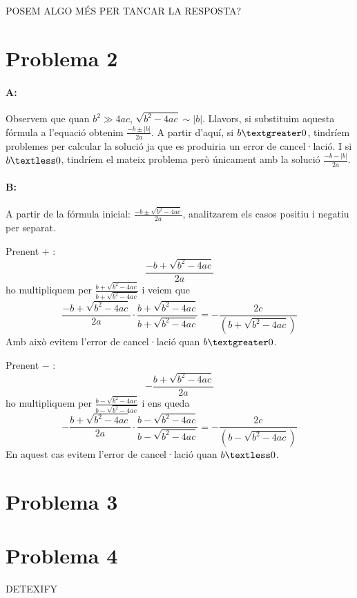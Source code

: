 \documentclass{article}
\begin{document}
	POSEM ALGO MÉS PER TANCAR LA RESPOSTA?
	
	\newpage
	
	\section{Problema 2}
	\paragraph{A:} Observem que quan $b^2 \gg 4ac$, $\sqrt{b^2-4ac}\sim|b|$. Llavors, si substituim aquesta fórmula a l'equació obtenim $\frac{-b\pm|b|}{2a}$. A partir d'aquí, si $b\textgreater0$, tindríem problemes per calcular la solució ja que es produiria un error de cancel·lació. I si $b\textless0$, tindríem el mateix problema però únicament amb la solució $\frac{-b-|b|}{2a}$.
	
	\paragraph{B:} A partir de la fórmula inicial: $\frac{-b\pm\sqrt{b^2-4ac}}{2a}$, analitzarem els casos positiu i negatiu per separat.
	
	Prenent + : $$\frac{-b+\sqrt{b^2-4ac}}{2a}$$ ho multipliquem per $\frac{b+\sqrt{b^2-4ac}}{b+\sqrt{b^2-4ac}}$ i veiem que 
	$$\frac{-b+\sqrt{b^2-4ac}}{2a}\cdot\frac{b+\sqrt{b^2-4ac}}{b+\sqrt{b^2-4ac}}=-\frac{2c}{(b+\sqrt{b^2-4ac})}$$
	Amb això evitem l'error de cancel·lació quan $b\textgreater0$.
	
	Prenent $-$ : $$-\frac{b+\sqrt{b^2-4ac}}{2a}$$
	ho multipliquem per $\frac{b-\sqrt{b^2-4ac}}{b-\sqrt{b^2-4ac}}$ i ens queda 
	$$-\frac{b+\sqrt{b^2-4ac}}{2a}\cdot\frac{b-\sqrt{b^2-4ac}}{b-\sqrt{b^2-4ac}}=-\frac{2c}{(b-\sqrt{b^2-4ac})}$$
	En aquest cas evitem l'error de cancel·lació quan $b\textless0$.
	
	
	\newpage
	
	\section{Problema 3}
	
	
	
	\newpage
	
	\section{Problema 4}
	
	
	
	
	DETEXIFY
	
\end{document}
